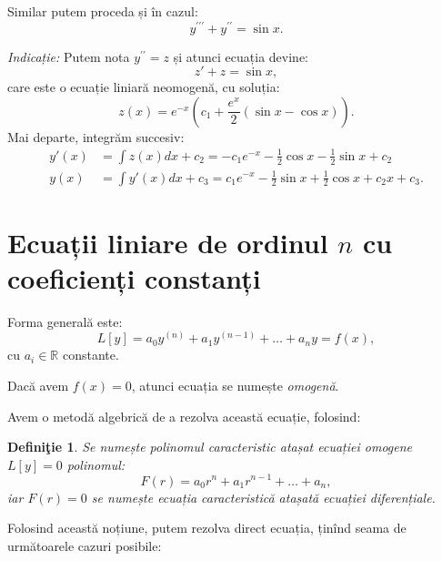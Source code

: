 \documentclass[11pt,a4paper]{article}
\newcommand\RR{\mathbb{R}}
\theoremstyle{dotless}
\theoremstyle{dotlessdr}
\newtheorem{definition}{Defini\c{t}ie}[section]
\begin{document}
\vspace{1cm}

Similar putem proceda și în cazul:
\[
  y^{\prime\prime\prime} + y^{\prime\prime} = \sin x.
\]

\emph{Indicație:} Putem nota $y^{\prime\prime} = z$ și atunci ecuația devine:
\[
  z' + z = \sin x,
\]
care este o ecuație liniară neomogenă, cu soluția:
\[
  z(x) = e^{-x}(c_1 + \frac{e^x}{2}(\sin x - \cos x)).
\]
Mai departe, integrăm succesiv:
\begin{align*}
  y'(x) &= \int z(x) dx + c_2 = -c_1 e^{-x} - \frac{1}{2} \cos x - \frac{1}{2}\sin x + c_2 \\
  y(x) &= \int y'(x) dx + c_3 = c_1 e^{-x} - \frac{1}{2} \sin x + \frac{1}{2} \cos x + c_2 x + c_3.
\end{align*}


\section{Ecuații liniare de ordinul $n$ cu coeficienți constanți}

Forma generală este:
\[
  L[y] = a_0 y^{(n)} + a_1 y^{(n-1)} + \dots + a_n y = f(x),
\]
cu $a_i \in \RR$ constante.

Dacă avem $f(x) = 0$, atunci ecuația se numește \emph{omogenă}.

Avem o metodă algebrică de a rezolva această ecuație, folosind:

\begin{definition}\label{def:pol-car-ec}
  Se numește \emph{polinomul caracteristic} atașat ecuației omogene $L[y] = 0$
  polinomul:
  \[
    F(r) = a_0 r^n + a_1 r^{n-1} + \dots + a_n,
  \]
  iar $F(r) = 0$ se numește \emph{ecuația caracteristică} atașată ecuației diferențiale.
\end{definition}

Folosind această noțiune, putem rezolva direct ecuația, ținînd seama de următoarele
cazuri posibile:
\end{document}
